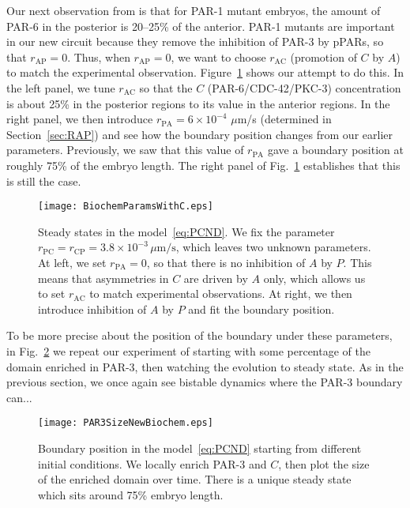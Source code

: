 \documentclass[11pt]{article}
\newcommand{\6}[1]{#1_{\text{6}}}
\newcommand{\3}[1]{#1_{\text{3}}}
\begin{document}
Our next observation from \cite{sailer2015dynamic} is that for PAR-1 mutant embryos, the amount of PAR-6 in the posterior is 20--25\% of the anterior. PAR-1 mutants are important in our new circuit because they remove the inhibition of PAR-3 by pPARs, so that $r_\text{AP}=0$. Thus, when $r_\text{AP}=0$, we want to choose $r_\text{AC}$ (promotion of $C$ by $A$) to match the experimental observation. Figure\ \ref{fig:ParamsC} shows our attempt to do this. In the left panel, we tune $r_\text{AC}$ so that the $C$ (PAR-6/CDC-42/PKC-3) concentration is about 25\% in the posterior regions to its value in the anterior regions. In the right panel, we then introduce $r_\text{PA}=6 \times 10^{-4}$ $\mu$m/s (determined in Section\ \ref{sec:RAP}) and see how the boundary position changes from our earlier parameters. Previously, we saw that this value of $r_\text{PA}$ gave a boundary position at roughly 75\% of the embryo length. The right panel of Fig.\ \ref{fig:ParamsC} establishes that this is still the case.

\begin{figure}
\centering
\texttt{[image: BiochemParamsWithC.eps]}
\caption{\label{fig:ParamsC}Steady states in the model\ \eqref{eq:PCND}. We fix the parameter $r_\text{PC}=r_\text{CP}=3.8 \times 10^{-3} \, \mu \text{m/s}$, which leaves two unknown parameters. At left, we set $r_\text{PA}=0$, so that there is no inhibition of $A$ by $P$. This means that asymmetries in $C$ are driven by $A$ only, which allows us to set $r_\text{AC}$ to match experimental observations. At right, we then introduce inhibition of $A$ by $P$ and fit the boundary position.}
\end{figure}

To be more precise about the position of the boundary under these parameters, in Fig.\ \ref{fig:P3NewBC} we repeat our experiment of starting with some percentage of the domain enriched in PAR-3, then watching the evolution to steady state. As in the previous section, we once again see bistable dynamics where the PAR-3 boundary can...


\begin{figure}
\centering
\texttt{[image: PAR3SizeNewBiochem.eps]}
\caption{\label{fig:P3NewBC}Boundary position in the model\ \eqref{eq:PCND} starting from different initial conditions. We locally enrich PAR-3 and $C$, then plot the size of the enriched domain over time. There is a unique steady state which sits around 75\% embryo length.}
\end{figure}
\end{document}
